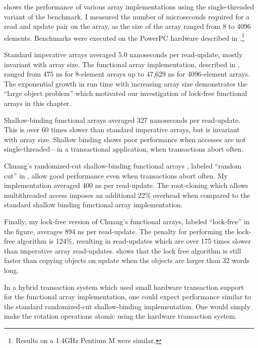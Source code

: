  shows the performance of various array
implementations using the single-threaded variant of the benchmark.
I measured the number of microseconds required for a read and update pair
on the array, as the size of the array ranged from 8 to 4096 elements.
Benchmarks were executed on the PowerPC hardware described in
.\footnote{Results on a 1.4GHz Pentium M were similar.}

Standard imperative arrays averaged 5.0 nanoseconds per read-update,
mostly invariant with array size.  The \naive functional array
implementation, described in , ranged from 475 ns
for 8-element arrays up to 47,629 ns for 4096-element arrays.  The
exponential growth in run time with increasing array size demonstrates the
``large object problem'' which motivated our investigation of
lock-free functional arrays in this chapter.

Shallow-binding functional arrays \cite{Baker91} averaged 327
nanoseconds per read-update.  This is over 60 times slower than
standard imperative arrays, but is invariant with array size.
Shallow binding shows poor performance when accesses are not
single-threaded---in a transactional application,
when transactions abort often.


Chuang's randomized-cut shallow-binding functional arrays
\cite{Chuang94}, labeled ``random cut'' in ,
allow good performance even when transactions abort
often.  My implementation averaged 400 ns per read-update.  The
root-cloning which allows multithreaded access imposes an additional
22\% overhead when compared to the standard shallow binding functional
array implementation.

Finally, my lock-free version of Chuang's functional arrays, labeled
``lock-free'' in the figure, averages
894 ns per read-update.  The penalty for performing the lock-free
algorithm is 124\%, resulting in read-updates which are over 175 times slower
than imperative array read-updates.    shows
that the lock free algorithm is still faster than copying objects on
update when the objects are larger than 32 words long.

In a hybrid transaction system which used small hardware transaction
support for the functional array implementation, one could expect
performance similar to the standard randomized-cut shallow-binding
implementation.  One would simply make the rotation operations atomic
using the hardware transaction system.




